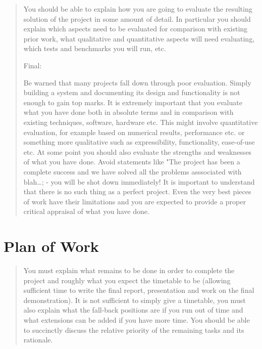 \documentclass{report}
\begin{document}
\begin{quote}
You should be able to explain how you are going to evaluate the
resulting solution of the project in some amount of detail. In
particular you should explain which aspects need to be evaluated
for comparison with existing prior work, what qualitative and
quantitative aspects will need evaluating, which tests and
benchmarks you will run, etc.

Final:

Be warned that many projects fall down through poor evaluation.
Simply building a system and documenting its design and
functionality is not enough to gain top marks. It is extremely
important that you evaluate what you have done both in absolute
terms and in comparison with existing techniques, software,
hardware etc. This might involve quantitative evaluation, for
example based on numerical results, performance etc. or something
more qualitative such as expressibility, functionality, ease-of-use
etc. At some point you should also evaluate the strengths and
weaknesses of what you have done. Avoid statements like "The
project has been a complete success and we have solved all the
problems asssociated with blah\ldots{}; - you will be shot down
immediately! It is important to understand that there is no such
thing as a perfect project. Even the very best pieces of work have
their limitations and you are expected to provide a proper critical
appraisal of what you have done.

\end{quote}
\section{Plan of Work}

\begin{quote}
You must explain what remains to be done in order to complete the
project and roughly what you expect the timetable to be (allowing
sufficient time to write the final report, presentation and work on
the final demonstration). It is not sufficient to simply give a
timetable, you must also explain what the fall-back positions are
if you run out of time and what extensions can be added if you have
more time. You should be able to succinctly discuss the relative
priority of the remaining tasks and its rationale.

\end{quote}
\end{document}
